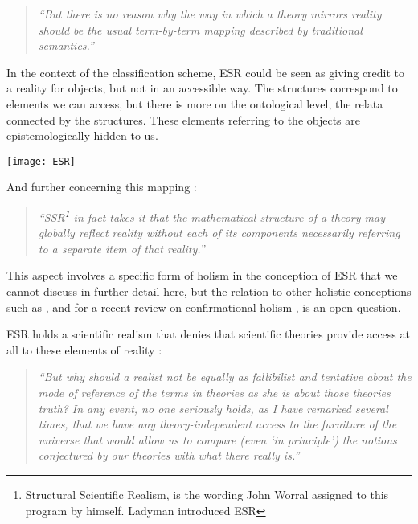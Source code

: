 \documentclass{article}
\begin{document}
\begin{quote}
\textit{``But there is no reason why the way in which a theory mirrors reality should be the usual term-by-term mapping described by
traditional semantics.''}
\end{quote}

In the context of the classification scheme, ESR could be seen as giving credit to a reality for objects, but not in an accessible way. The structures correspond to elements we can access, but there is more on the ontological level, the relata connected by the structures. These elements referring to the objects are epistemologically hidden to us.

\begin{minipage}{\textwidth}
\centering
\texttt{[image: ESR]}
\end{minipage}
\bigskip


And further concerning this mapping \cite[p.154]{worrall2007miracles}:

\begin{quote}
\textit{``SSR\footnote{Structural Scientific Realism, is the wording John Worral assigned to this program by himself. Ladyman introduced ESR} in fact takes it that the mathematical structure of a theory may globally reflect reality without each of its components necessarily referring to a separate item of that reality.''}
\end{quote}

This aspect involves a specific form of holism in the conception of ESR that we cannot discuss in further detail here, but the relation to other holistic conceptions such as \cite[]{bohm1987ontological}, \cite[]{quine1951main} and for a recent review on confirmational holism \cite[]{carlson2015logic}, is an open question. \newline 

ESR holds a scientific realism that denies that scientific theories provide access at all to these elements of reality \cite{worrall2007miracles}:

\begin{quote}
\textit{``But why should a realist not be equally as fallibilist and tentative about the mode of reference of the terms in theories as she is about those theories truth? In any event, no one seriously holds, as I have remarked several times, that we have any theory-independent access to the furniture of the universe that would allow us to
compare (even ‘in principle’) the notions conjectured by our theories with what there really is.''}
\end{quote}
\end{document}
